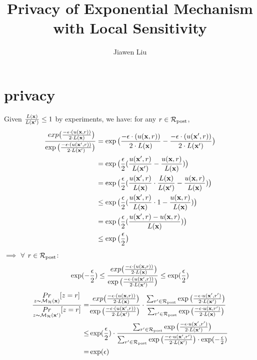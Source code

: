 \documentclass{article}
\begin{document}
\title{Privacy of Exponential Mechanism with Local Sensitivity}

\author[*]{Jiawen Liu}
\maketitle

\section{privacy}
Given $\frac{L(\textbf{x})}{L(\textbf{x}')} \leq 1$ by experiments, we have: for any $r \in \mathcal{R}_{\textup{post}}$,
  \begin{equation*}
  \begin{split}
  \frac {\
  exp\big(
  \frac{-\epsilon\cdot(u(\textbf{x}, {r}))}{2\cdot L(\textbf{x})}
  \big)}
  {\exp\big(
  \frac
  {-\epsilon\cdot(u(\textbf{x}', {r}))}{2\cdot L(\textbf{x}')}
  \big)}
  & = \exp\big(
  \frac{-\epsilon\cdot(u(\textbf{x}, {r}))}{2\cdot L(\textbf{x})}
  - 
  \frac{-\epsilon\cdot(u(\textbf{x}', {r}))}{2\cdot L(\textbf{x}')}
  \big)\\
  & = \exp
  \big(
  \frac{\epsilon}{2}
  (\frac{u(\textbf{x}', {r})}{L(\textbf{x}')}
  - 
  \frac{u(\textbf{x}, {r})}{ L(\textbf{x})})
  \big)\\
  & = \exp
  \big(
  \frac{\epsilon}{2}
  (\frac{u(\textbf{x}', {r})}{ L(\textbf{x})}\cdot \frac{L(\textbf{x})}{L(\textbf{x}')}
  - 
  \frac{u(\textbf{x}, {r})}{L(\textbf{x})} )
  \big)\\
  & \leq \exp
  \big(
  \frac{\epsilon}{2}
  (\frac{u(\textbf{x}', {r})}{ L(\textbf{x})}\cdot 1
  - 
  \frac{u(\textbf{x}, {r})}{L(\textbf{x})})
  \big)\\
  & = \exp
  \big(
  \frac{\epsilon}{2}
  (\frac{u(\textbf{x}', {r}) - u(\textbf{x}, {r})}{L(\textbf{x})})
  \big)\\
  & \leq \exp
  \big(
  \frac{\epsilon}{2}
  \big)
  \end{split}
  \end{equation*}
$\implies $ $\forall$ $r \in \mathcal{R}_{\textup{post}}$:
$$
\exp(-\frac{\epsilon}{2}) \leq \frac {\
  exp\big(
  \frac{-\epsilon\cdot(u(\textbf{x}, {r}))}{2\cdot L(\textbf{x})}
  \big)}
  {\exp\big(
  \frac
  {-\epsilon\cdot(u(\textbf{x}', {r}))}{2\cdot L(\textbf{x}')}
  \big)}
\leq \exp(\frac{\epsilon}{2})
$$
\begin{align*}
\frac{\underset{z \thicksim \mathcal{M}_{\mathcal{H}}(\textbf{x})}{Pr}[z = r]}{\underset{z \thicksim \mathcal{M}_{\mathcal{H}}(\textbf{x}')}{Pr}[z = r]}
= & \frac {\
  exp\big(
  \frac{-\epsilon\cdot(u(\textbf{x}, {r}))}{2\cdot L(\textbf{x})}
  \big)}
  {\exp\big(
  \frac
  {-\epsilon\cdot(u(\textbf{x}', {r}))}{2\cdot L(\textbf{x}')}
  \big)} 
  \cdot
  \frac{\sum_{r'\in \mathcal{R}_{\textup{post}}} \exp \big(\frac{-\epsilon\cdot u(\textbf{x}', r')}{2 \cdot L(\textbf{x}')}\big)}{\sum_{r'\in \mathcal{R}_{\textup{post}}} \exp \big(\frac{-\epsilon\cdot u(\textbf{x}, r')}{2 \cdot L(\textbf{x})}\big)}
  \\
\leq & \exp(\frac{\epsilon}{2}) 
\cdot 
\frac{\sum_{r'\in \mathcal{R}_{\textup{post}}} \exp \big(\frac{-\epsilon\cdot u(\textbf{x}', r')}{2 \cdot L(\textbf{x}')}\big)}
{\sum_{r'\in \mathcal{R}_{\textup{post}}} \exp \big(\frac{-\epsilon\cdot u(\textbf{x}', r')}{2 \cdot L(\textbf{x}')}\big)\cdot \exp(-\frac{\epsilon}{2})}\\
= & \exp(\epsilon)
\end{align*}


  
\end{document}
